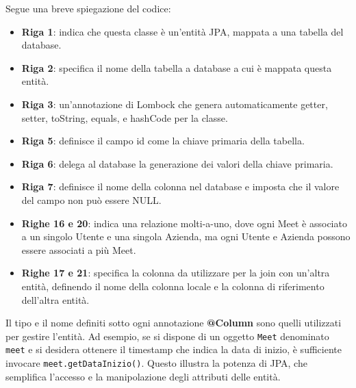 Segue una breve spiegazione del codice:
\begin{itemize}
    \item \textbf{Riga 1}: indica che questa classe è un'entità JPA, mappata a una tabella del database.
    \item \textbf{Riga 2}: specifica il nome della tabella a database  a cui è mappata questa entità.
    \item \textbf{Riga 3}: un'annotazione di Lombock che genera automaticamente getter, setter, toString, equals, e hashCode per la classe.
    \item \textbf{Riga 5}: definisce il campo id come la chiave primaria della tabella.
    \item \textbf{Riga 6}: delega al database la generazione dei valori della chiave primaria.
    \item \textbf{Riga 7}:  definisce il nome della colonna nel database e imposta che il valore del campo non può essere NULL.
    \item \textbf{Righe 16 e 20}: indica una relazione molti-a-uno, dove ogni Meet è associato a un singolo Utente e una singola Azienda,
    ma ogni Utente e Azienda possono essere associati a più Meet.
    \item \textbf{Righe 17 e 21}:  specifica la colonna da utilizzare per la join 
    con un'altra entità, definendo il nome della colonna locale e la colonna di riferimento dell'altra entità.
\end{itemize}
Il tipo e il nome definiti sotto ogni annotazione \textbf{@Column} sono quelli utilizzati per gestire l'entità. 
Ad esempio, se si dispone di un oggetto \texttt{Meet} denominato \texttt{meet} e si desidera ottenere il timestamp che 
indica la data di inizio, è sufficiente invocare \texttt{meet.getDataInizio()}. 
Questo illustra la potenza di JPA, che semplifica l'accesso e la manipolazione degli attributi delle entità.